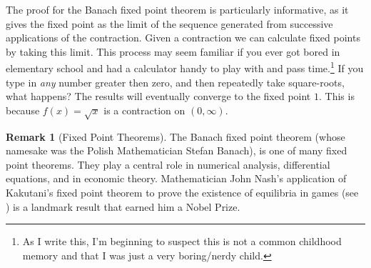 \documentclass{article}
\theoremstyle{definition}
\newtheorem{remark}{Remark}[section]
\begin{document}
The proof for the Banach fixed point theorem is particularly informative, as it gives the fixed point as the limit of the sequence generated from successive applications of the contraction. Given a contraction we can calculate fixed points by taking this limit. This process may seem familiar if you ever got bored in elementary school and had a calculator handy to play with and pass time.\footnote{As I write this, I'm beginning to suspect this is not a common childhood memory and that I was just a very boring/nerdy child.} If you type in \textit{any} number greater then zero, and then repeatedly take square-roots, what happens? The results will eventually converge to the fixed point $ 1 $. This is because $ f(x)=\sqrt{x} $ is a contraction on $ (0,\infty) $. 	
\begin{remark}[Fixed Point Theorems]
	The Banach fixed point theorem (whose namesake was the Polish Mathematician Stefan Banach), is one of many fixed point theorems. They play a central role in numerical analysis, differential equations, and in economic theory. Mathematician John Nash's application of Kakutani's fixed point theorem to prove the existence of equilibria in games (see \cite{nash1950equilibrium}) is a landmark result that earned him a Nobel Prize.
\end{remark}
\end{document}
